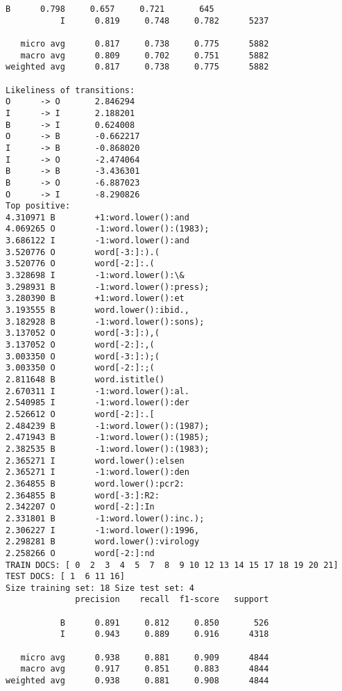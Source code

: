 \documentclass[11pt]{article}
\begin{document}
\begin{Verbatim}[commandchars=\\\{\}]
           B      0.798     0.657     0.721       645
           I      0.819     0.748     0.782      5237

   micro avg      0.817     0.738     0.775      5882
   macro avg      0.809     0.702     0.751      5882
weighted avg      0.817     0.738     0.775      5882

Likeliness of transitions:
O      -> O       2.846294
I      -> I       2.188201
B      -> I       0.624008
O      -> B       -0.662217
I      -> B       -0.868020
I      -> O       -2.474064
B      -> B       -3.436301
B      -> O       -6.887023
O      -> I       -8.290826
Top positive:
4.310971 B        +1:word.lower():and
4.069265 O        -1:word.lower():(1983);
3.686122 I        -1:word.lower():and
3.520776 O        word[-3:]:).(
3.520776 O        word[-2:]:.(
3.328698 I        -1:word.lower():\&
3.298931 B        -1:word.lower():press);
3.280390 B        +1:word.lower():et
3.193555 B        word.lower():ibid.,
3.182928 B        -1:word.lower():sons);
3.137052 O        word[-3:]:),(
3.137052 O        word[-2:]:,(
3.003350 O        word[-3:]:);(
3.003350 O        word[-2:]:;(
2.811648 B        word.istitle()
2.670311 I        -1:word.lower():al.
2.540985 I        -1:word.lower():der
2.526612 O        word[-2:]:.[
2.484239 B        -1:word.lower():(1987);
2.471943 B        -1:word.lower():(1985);
2.382535 B        -1:word.lower():(1983);
2.365271 I        word.lower():elsen
2.365271 I        -1:word.lower():den
2.364855 B        word.lower():pcr2:
2.364855 B        word[-3:]:R2:
2.342207 O        word[-2:]:In
2.331801 B        -1:word.lower():inc.);
2.306227 I        -1:word.lower():1996,
2.298281 B        word.lower():virology
2.258266 O        word[-2:]:nd
TRAIN DOCS: [ 0  2  3  4  5  7  8  9 10 12 13 14 15 17 18 19 20 21] TEST DOCS: [ 1  6 11 16]
Size training set: 18 Size test set: 4
              precision    recall  f1-score   support

           B      0.891     0.812     0.850       526
           I      0.943     0.889     0.916      4318

   micro avg      0.938     0.881     0.909      4844
   macro avg      0.917     0.851     0.883      4844
weighted avg      0.938     0.881     0.908      4844


\end{Verbatim}
\end{document}
